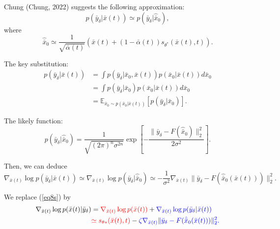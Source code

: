 \documentclass[mathserif,envcountsect,compress,8pt]{beamer}
\begin{document}
\begin{frame}
	\setlength{\parskip}{0.6\baselineskip}
	
	Chung (Chung, 2022) suggests the following approximation:
	{\color{red}
	\begin{equation*}
		p(\bar{y}_{\delta}|\bar{x}(t))\simeq p(\bar{y}_{\delta}|\hat{\bar{x}}_0),
	\end{equation*}}
	where
		{\color{blue}
			\begin{equation*}
				\hat{\bar{x}}_0\simeq\frac{1}{\sqrt{\bar\alpha(t)}}(\bar{x}(t)+(1-\bar\alpha(t))s_{\theta^*}(\bar{x}(t),t)).
			\end{equation*}
		}
	
	The key substitution:
	\begin{equation}
		\begin{aligned}
			p(\bar{y}_{\delta}|\bar{x}(t)) & =\int p(\bar{y}_{\delta}|\bar{x}_0,\bar{x}(t))p(\bar{x}_0|\bar{x}(t))d\bar{x}_0      \\
			                               & =\int p(\bar{y}_{\delta}|\bar{x}_0)p(\bar{x}_0|\bar{x}(t))d\bar{x}_0                 \\
			                               & =\mathbb{E}_{\bar{x}_0\sim p(\bar{x}_0|\bar{x}(t))}[p(\bar{y}_{\delta}|\bar{x}_0)].
		\end{aligned}
	\end{equation}
\end{frame}


\begin{frame}

	The likely function:
	\begin{equation*}
		p(\bar{y}_{\delta}|\hat{\bar{x}}_0)=\frac{1}{\sqrt{(2\pi)^n\sigma^{2n}}}\exp[-\frac{\|\bar{y}_{\delta}-F(\hat{\bar{x}}_0)\|_2^2}{2\sigma^2}].
	\end{equation*}
	
	Then, we can deduce
	\begin{equation}
		\nabla_{\bar{x}(t)}\log p(\bar{y}_{\delta}|\bar{x}(t))\simeq
		\nabla_{\bar{x}(t)}\log p(\bar{y}_{\delta}|\hat{\bar{x}}_0)\simeq -\frac{1}{\sigma^2}\nabla_{\bar{x}(t)}\|\bar{y}_{\delta}-F(\hat{\bar{x}}_0(\bar{x}(t)))\|_2^2.
		\label{eq15}
	\end{equation}
	
	We replace (\ref{eq8s}) by
	\begin{align*}
		\nabla_{\bar{x}(t)}\log p(\bar{x}(t)|\bar{y}_{\delta}) & = {\color{red}\nabla_{\bar{x}(t)}\log p(\bar{x}(t))}+{\color{blue}\nabla_{\bar{x}(t)}\log p(\bar{y}_{\delta}|\bar{x}(t))}                     \\
		                                                       & {\color{red}\simeq s_{\theta*}(\bar{x}(t),t)}-{\color{blue}\zeta\nabla_{\bar{x}(t)}\|\bar{y}_{\delta}-F(\hat{\bar{x}}_0(\bar{x}(t)))\|_2^2.}
	\end{align*}
\end{frame}
\end{document}
